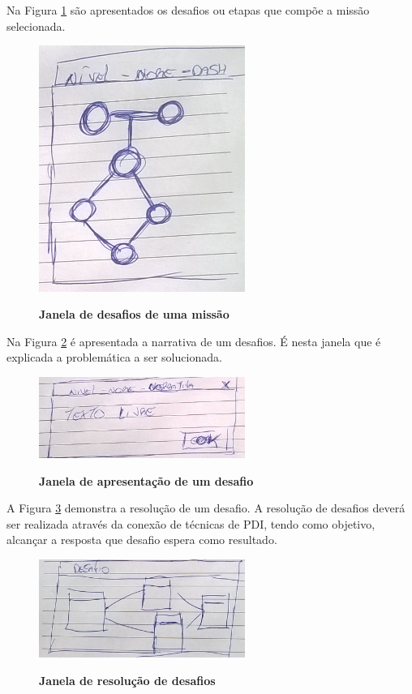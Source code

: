 \documentclass[
	12pt,				%
	oneside,			%
	a4paper,			%
	english,			%
	french,				%
	spanish,			%
	brazil,				%
	]{abntex2}
\begin{document}
Na Figura \ref{fig:janelaMissaoDesafio} são apresentados os desafios ou etapas que compõe a missão selecionada.

\begin{figure}[ht]
\centering
\caption{\textbf{Janela de desafios de uma missão}}
\includegraphics[width=0.6\textwidth]{imagens/proposta_nivel.png}
\sourceAuthor
\label{fig:janelaMissaoDesafio}
\end{figure}

Na Figura \ref{fig:janelaMissaoDesafioApresentacao} é apresentada a narrativa de um desafios. É nesta janela que é explicada a problemática a ser solucionada.

\begin{figure}[ht]
\centering
\caption{\textbf{Janela de apresentação de um desafio}}
\includegraphics[width=0.6\textwidth]{imagens/proposta_narrativa.png}
\sourceAuthor
\label{fig:janelaMissaoDesafioApresentacao}
\end{figure}

A Figura \ref{fig:janelaMissaoDesafioResolucao} demonstra a resolução de um desafio. A resolução de desafios deverá ser realizada através da conexão de técnicas de PDI, tendo como objetivo, alcançar a resposta que desafio espera como resultado. 

\begin{figure}[ht]
\centering
\caption{\textbf{Janela de resolução de desafios}}
\includegraphics[width=0.6\textwidth]{imagens/proposta_desafio.png}
\sourceAuthor
\label{fig:janelaMissaoDesafioResolucao}
\end{figure}
\end{document}
